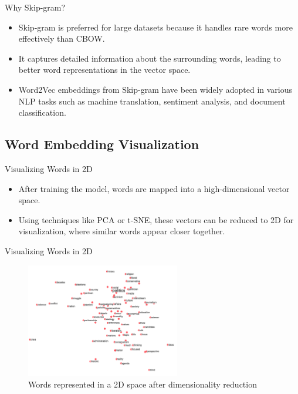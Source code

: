 \documentclass[serif, aspectratio=169]{beamer}
\begin{document}
\begin{frame}{Why Skip-gram?}
    \begin{itemize}
        \item Skip-gram is preferred for large datasets because it handles rare words more effectively than CBOW.
        \item It captures detailed information about the surrounding words, leading to better word representations in the vector space.
        \item Word2Vec embeddings from Skip-gram have been widely adopted in various NLP tasks such as machine translation, sentiment analysis, and document classification.
    \end{itemize}
\end{frame}

\subsection{Word Embedding Visualization}

\begin{frame}{Visualizing Words in 2D}
    \begin{itemize}
        \item After training the model, words are mapped into a high-dimensional vector space.
        \item Using techniques like PCA or t-SNE, these vectors can be reduced to 2D for visualization, where similar words appear closer together.
    \end{itemize}
\end{frame}

\begin{frame}{Visualizing Words in 2D}
	\begin{figure}
		\centering
		\includegraphics[width=0.6\textwidth]{pic/3.png}
		\caption*{Words represented in a 2D space after dimensionality reduction}
	\end{figure}
\end{frame}
\end{document}

